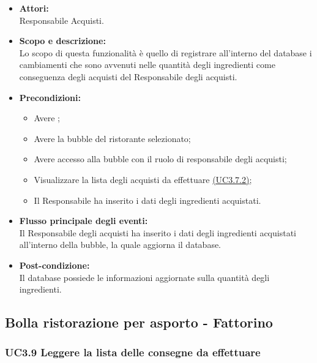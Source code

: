 \begin{itemize}
	\item \textbf{Attori:}
	\\Responsabile Acquisti.
	\item \textbf{Scopo e descrizione:} 
	\\Lo scopo di questa funzionalità è quello di registrare all’interno del database i cambiamenti che sono avvenuti nelle quantità degli ingredienti come conseguenza degli acquisti del Responsabile degli acquisti.
	\item \textbf{Precondizioni:}
	\begin{itemize}
		\item Avere ;
		\item Avere la bubble del ristorante selezionato;
		\item Avere accesso alla bubble con il ruolo di responsabile degli acquisti;
		\item Visualizzare la lista degli acquisti da effettuare \hyperref[UC3.7.2]{(UC3.7.2)};
		\item Il Responsabile ha inserito i dati degli ingredienti acquistati.
	\end{itemize}
	\item \textbf{Flusso principale degli eventi:}
	\\Il Responsabile degli acquisti ha inserito i dati degli ingredienti acquistati all’interno della bubble, la quale aggiorna il database.
	\item \textbf{Post-condizione:}
	\\Il database possiede le informazioni aggiornate sulla quantità degli ingredienti.
\end{itemize}

\subsection{Bolla ristorazione per asporto - Fattorino}

\subsubsection{UC3.9 Leggere la lista delle consegne da effettuare} \label{UC3.9}

